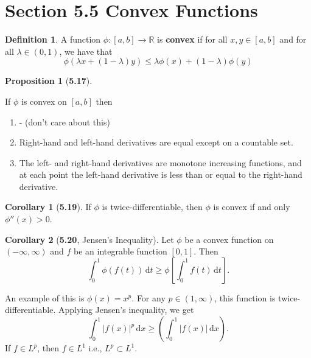 \documentclass[12pt]{article}
\newcommand{\R}{\mathbb{R}}
\theoremstyle{definition}
\newtheorem*{definition}{Definition}
\newtheorem*{cor}{Corollary}
\newtheorem*{prop}{Proposition}
\begin{document}
\section*{Section 5.5 Convex Functions}

\begin{definition}
    A function \( \phi: [a,b] \to \R  \) is \textbf{convex} if for all \( x,y \in [a,b] \) and for all \( \lambda \in (0,1) \), we have that 
        \[
            \phi(\lambda x + (1-\lambda)y) \leq \lambda \phi(x) + (1-\lambda)\phi(y)  
        \]  
\end{definition}

\begin{prop}[\textbf{5.17}]\

    If \( \phi \) is convex on \( [a,b] \) then 
        \begin{enumerate}[label = (\arabic{*})]
            \item - (don't care about this)
            \item Right-hand and left-hand derivatives are equal except on a countable set. 
            \item The left- and right-hand derivatives are monotone increasing functions, and at each point the left-hand derivative is less than or equal to the right-hand derivative.
        \end{enumerate}
    
\end{prop}

\begin{cor}[\textbf{5.19}]

    If \( \phi \) is twice-differentiable, then \( \phi \) is convex if and only \( \phi''(x) > 0 \).

\end{cor}

\begin{cor}[\textbf{5.20}, Jensen's Inequality]

    Let \( \phi \) be a convex function on \( (-\infty, \infty) \) and \( f \) be an integrable function \( [0,1] \). Then
        \[
            \int_{0}^{1} \phi(f(t)) \,\mathrm{d} t \geq \phi \left[ \int_{0}^{1} f(t) \,\mathrm{d}t \right].
        \]


\end{cor}

An example of this is \( \phi(x) = x^{p} \). For any \( p \in (1, \infty) \), this function is twice-differentiable. Applying Jensen's inequality, we get
    \[
        \int_{0}^{1} |f(x)|^{p} \, \mathrm{d}x \geq \left( \int_{0}^{1} |f(x)| \, \mathrm{d} x\right).
    \]
If \( f \in L^p \), then \( f \in L^1 \) i.e., \( L^p \subset L^1 \).
\end{document}

